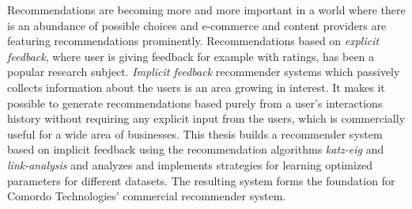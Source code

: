 
Recommendations are becoming more and more important in a world where there is an abundance of possible choices and e-commerce and content providers are featuring recommendations prominently. Recommendations based on \textit{explicit feedback}, where user is giving feedback for example with ratings, has been a popular research subject. \textit{Implicit feedback} recommender systems which passively collects information about the users is an area growing in interest. It makes it possible to generate recommendations based purely from a user's interactions history without requiring any explicit input from the users, which is commercially useful for a wide area of businesses. This thesis builds a recommender system based on implicit feedback using the recommendation algorithms \textit{katz-eig} and \textit{link-analysis} and analyzes and implements strategies for learning optimized parameters for different datasets. The resulting system forms the foundation for Comordo Technologies' commercial recommender system.

